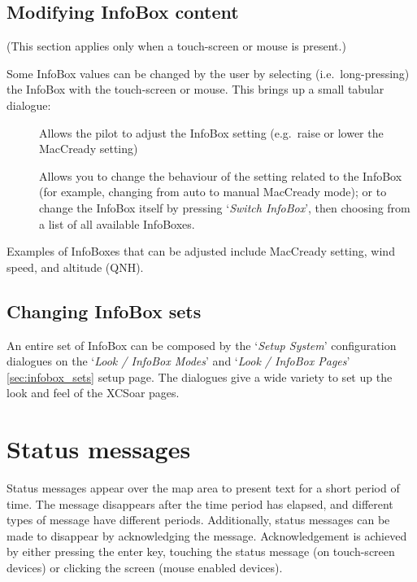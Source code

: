 \blink{}\blink{}\blink{}\blink{}


\subsection*{Modifying InfoBox content}

(This section applies only when a touch-screen or mouse is present.)

Some InfoBox values can be changed by the user by selecting (i.e.\ long-pressing) the
InfoBox with the touch-screen or mouse.  This brings up a small tabular dialogue:

\begin{description}
\item[]  
  Allows the pilot to adjust the InfoBox setting (e.g.\ raise or lower the
  MacCready setting)

\item[]
  Allows you to change the behaviour of the setting related to the InfoBox 
  (for example, changing from auto to manual MacCready mode); or 
  to change the InfoBox itself by pressing `{\it Switch InfoBox}', then 
  choosing from a list of all available InfoBoxes.

\end{description}

Examples of InfoBoxes that can
be adjusted include MacCready setting, wind speed, and altitude (QNH).


\subsection*{Changing InfoBox sets}

An entire set of InfoBox can be composed by the `{\it Setup System}' configuration 
dialogues on the `{\it Look / InfoBox Modes}' and `{\it Look / InfoBox Pages}' 
\ref{sec:infobox_sets} setup page. 
The dialogues give a wide variety to set up the look and feel of the XCSoar pages.  


\section{Status messages}

Status messages appear over the map area to present text for a short period of
time.  The message disappears after the time period has elapsed, and different
types of message have different periods. Additionally, status messages can be
made to disappear by acknowledging the message.  Acknowledgement is achieved by
either pressing the enter key, touching the status
message (on touch-screen devices) or clicking the screen (mouse enabled devices).

